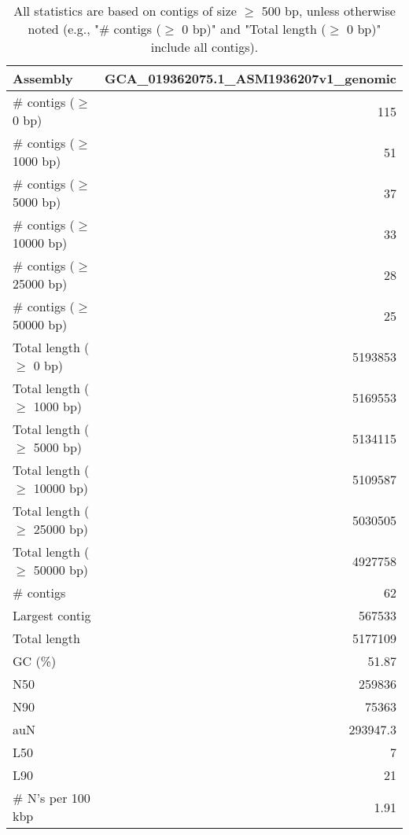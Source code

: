 \documentclass[12pt,a4paper]{article}
\begin{document}
\begin{table}[ht]
\begin{center}
\caption{All statistics are based on contigs of size $\geq$ 500 bp, unless otherwise noted (e.g., "\# contigs ($\geq$ 0 bp)" and "Total length ($\geq$ 0 bp)" include all contigs).}
\begin{tabular}{|l*{1}{|r}|}
\hline
Assembly & GCA\_019362075.1\_ASM1936207v1\_genomic \\ \hline
\# contigs ($\geq$ 0 bp) & 115 \\ \hline
\# contigs ($\geq$ 1000 bp) & 51 \\ \hline
\# contigs ($\geq$ 5000 bp) & 37 \\ \hline
\# contigs ($\geq$ 10000 bp) & 33 \\ \hline
\# contigs ($\geq$ 25000 bp) & 28 \\ \hline
\# contigs ($\geq$ 50000 bp) & 25 \\ \hline
Total length ($\geq$ 0 bp) & 5193853 \\ \hline
Total length ($\geq$ 1000 bp) & 5169553 \\ \hline
Total length ($\geq$ 5000 bp) & 5134115 \\ \hline
Total length ($\geq$ 10000 bp) & 5109587 \\ \hline
Total length ($\geq$ 25000 bp) & 5030505 \\ \hline
Total length ($\geq$ 50000 bp) & 4927758 \\ \hline
\# contigs & 62 \\ \hline
Largest contig & 567533 \\ \hline
Total length & 5177109 \\ \hline
GC (\%) & 51.87 \\ \hline
N50 & 259836 \\ \hline
N90 & 75363 \\ \hline
auN & 293947.3 \\ \hline
L50 & 7 \\ \hline
L90 & 21 \\ \hline
\# N's per 100 kbp & 1.91 \\ \hline
\end{tabular}
\end{center}
\end{table}
\end{document}
